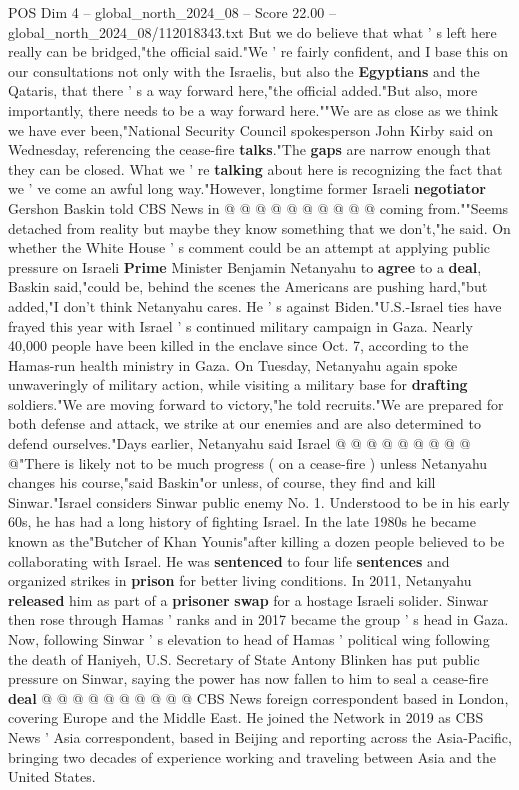 \begin{textsample}{POS Dim 4 – global\_north\_2024\_08 – Score 22.00 – global\_north\_2024\_08/112018343.txt}
But we do believe that what ' s left here really can be bridged,"the official said."We ' re fairly confident, and I base this on our consultations not only with the Israelis, but also the \textbf{Egyptians} and the Qataris, that there ' s a way forward here,"the official added."But also, more importantly, there needs to be a way forward here.""We are as close as we think we have ever been,"National Security Council spokesperson John Kirby said on Wednesday, referencing the cease-fire \textbf{talks}."The \textbf{gaps} are narrow enough that they can be closed.
What we ' re \textbf{talking} about here is recognizing the fact that we ' ve come an awful long way."However, longtime former Israeli \textbf{negotiator} Gershon Baskin told CBS News in @ @ @ @ @ @ @ @ @ @ coming from.""Seems detached from reality but maybe they know something that we don't,"he said.
On whether the White House ' s comment could be an attempt at applying public pressure on Israeli \textbf{Prime} Minister Benjamin Netanyahu to \textbf{agree} to a \textbf{deal}, Baskin said,"could be, behind the scenes the Americans are pushing hard,"but added,"I don't think Netanyahu cares.
He ' s against Biden."U.S.-Israel ties have frayed this year with Israel ' s continued military campaign in Gaza.
Nearly 40,000 people have been killed in the enclave since Oct. 7, according to the Hamas-run health ministry in Gaza.
On Tuesday, Netanyahu again spoke unwaveringly of military action, while visiting a military base for \textbf{drafting} soldiers."We are moving forward to victory,"he told recruits."We are prepared for both defense and attack, we strike at our enemies and are also determined to defend ourselves."Days earlier, Netanyahu said Israel @ @ @ @ @ @ @ @ @ @"There is likely not to be much progress ( on a cease-fire ) unless Netanyahu changes his course,"said Baskin"or unless, of course, they find and kill Sinwar."Israel considers Sinwar public enemy No. 1.
Understood to be in his early 60s, he has had a long history of fighting Israel.
In the late 1980s he became known as the"Butcher of Khan Younis"after killing a dozen people believed to be collaborating with Israel.
He was \textbf{sentenced} to four life \textbf{sentences} and organized strikes in \textbf{prison} for better living conditions.
In 2011, Netanyahu \textbf{released} him as part of a \textbf{prisoner} \textbf{swap} for a hostage Israeli solider.
Sinwar then rose through Hamas ' ranks and in 2017 became the group ' s head in Gaza.
Now, following Sinwar ' s elevation to head of Hamas ' political wing following the death of Haniyeh, U.S.
Secretary of State Antony Blinken has put public pressure on Sinwar, saying the power has now fallen to him to seal a cease-fire \textbf{deal} @ @ @ @ @ @ @ @ @ @ CBS News foreign correspondent based in London, covering Europe and the Middle East.
He joined the Network in 2019 as CBS News ' Asia correspondent, based in Beijing and reporting across the Asia-Pacific, bringing two decades of experience working and traveling between Asia and the United States.


\end{textsample}
